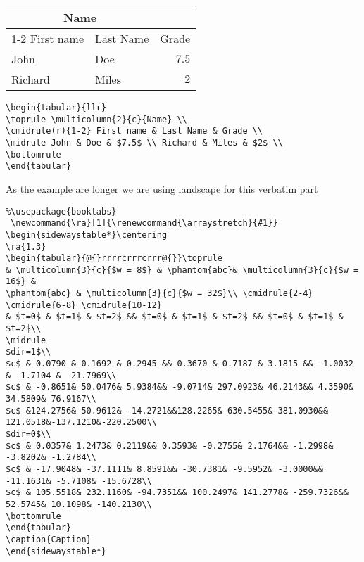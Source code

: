 \begin{tabular}{llr}
\toprule \multicolumn{2}{c}{Name} \\ 
\cmidrule(r){1-2} First name & Last Name & Grade \\ 
\midrule John & Doe & $7.5$ \\ Richard & Miles & $2$ \\ 
\bottomrule 
\end{tabular} 

\begin{verbatim}
\begin{tabular}{llr}
\toprule \multicolumn{2}{c}{Name} \\ 
\cmidrule(r){1-2} First name & Last Name & Grade \\ 
\midrule John & Doe & $7.5$ \\ Richard & Miles & $2$ \\ 
\bottomrule 
\end{tabular} 
\end{verbatim}

\lipsum[1-3]

\begin{landscape}
As the example are longer we are using landscape for this verbatim part
\begin{verbatim} 
%\usepackage{booktabs}
 \newcommand{\ra}[1]{\renewcommand{\arraystretch}{#1}}
\begin{sidewaystable*}\centering
\ra{1.3}
\begin{tabular}{@{}rrrrcrrrcrrr@{}}\toprule
& \multicolumn{3}{c}{$w = 8$} & \phantom{abc}& \multicolumn{3}{c}{$w = 16$} &
\phantom{abc} & \multicolumn{3}{c}{$w = 32$}\\ \cmidrule{2-4} \cmidrule{6-8} \cmidrule{10-12}
& $t=0$ & $t=1$ & $t=2$ && $t=0$ & $t=1$ & $t=2$ && $t=0$ & $t=1$ & $t=2$\\ 
\midrule
$dir=1$\\
$c$ & 0.0790 & 0.1692 & 0.2945 && 0.3670 & 0.7187 & 3.1815 && -1.0032 & -1.7104 & -21.7969\\
$c$ & -0.8651& 50.0476& 5.9384&& -9.0714& 297.0923& 46.2143&& 4.3590& 34.5809& 76.9167\\
$c$ &124.2756&-50.9612& -14.2721&&128.2265&-630.5455&-381.0930&& 121.0518&-137.1210&-220.2500\\
$dir=0$\\
$c$ & 0.0357& 1.2473& 0.2119&& 0.3593& -0.2755& 2.1764&& -1.2998& -3.8202& -1.2784\\
$c$ & -17.9048& -37.1111& 8.8591&& -30.7381& -9.5952& -3.0000&& -11.1631& -5.7108& -15.6728\\
$c$ & 105.5518& 232.1160& -94.7351&& 100.2497& 141.2778& -259.7326&& 52.5745& 10.1098& -140.2130\\ 
\bottomrule
\end{tabular}
\caption{Caption}
\end{sidewaystable*}
\end{verbatim}


\newpage 
\end{landscape}

